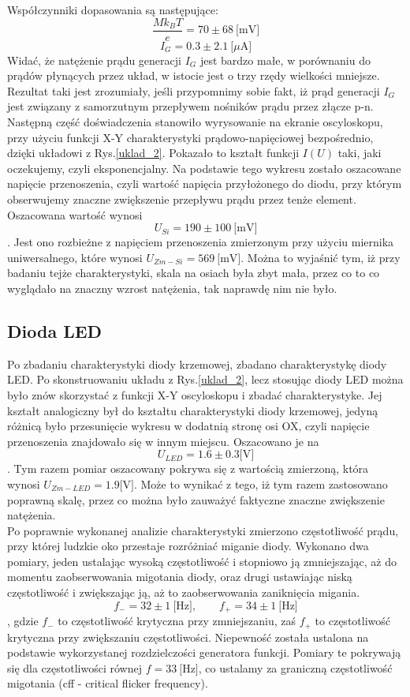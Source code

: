 \documentclass[10pt,a4paper]{article}
\begin{document}
Współczynniki dopasowania są następujące:
$$ \frac{Mk_BT}{e} = 70 \pm 68 \ \text{[mV]}$$
$$ I_G = 0.3 \pm 2.1 \ \text{[$\mu$A]} $$
Widać, że natężenie prądu generacji $I_G$ jest bardzo małe, w porównaniu do prądów płynących przez układ, w istocie jest o trzy rzędy wielkości mniejsze. Rezultat taki jest zrozumiały, jeśli przypomnimy sobie fakt, iż prąd generacji $I_G$ jest związany z samorzutnym przepływem nośników prądu przez złącze p-n. \\
Następną część doświadczenia stanowiło wyrysowanie na ekranie oscyloskopu, przy użyciu funkcji X-Y charakterystyki prądowo-napięciowej bezpośrednio, dzięki układowi z Rys.\ref{uklad_2}. Pokazało to kształt funkcji $I(U)$ taki, jaki oczekujemy, czyli eksponencjalny. Na podstawie tego wykresu zostało oszacowane napięcie przenoszenia, czyli wartość napięcia przyłożonego do diodu, przy którym obserwujemy znaczne zwiększenie przepływu prądu przez tenże element. Oszacowana wartość wynosi 
$$ U_{Si} = 190 \pm 100 \ \text{[mV]} $$.
Jest ono rozbieżne z napięciem przenoszenia zmierzonym przy użyciu miernika uniwersalnego, które wynosi $U_{Zm-Si} = 569 \ \text{[mV]}$. Można to wyjaśnić tym, iż przy badaniu tejże charakterystyki, skala na osiach była zbyt mała, przez co to co wyglądało na znaczny wzrost natężenia, tak naprawdę nim nie było.

\subsection*{Dioda LED}
Po zbadaniu charakterystyki diody krzemowej, zbadano charakterystykę diody LED. Po skonstruowaniu układu z Rys.\ref{uklad_2}, lecz stosując diody LED można było znów skorzystać z funkcji X-Y oscyloskopu i zbadać charakterystyke. Jej kształt analogiczny był do kształtu charakterystyki diody krzemowej, jedyną różnicą było przesunięcie wykresu w dodatnią stronę osi OX, czyli napięcie przenoszenia znajdowało się w innym miejscu. Oszacowano je na 
$$ U_{LED} = 1.6 \pm 0.3 \text{[V]} $$. 
Tym razem pomiar oszacowany pokrywa się z wartością zmierzoną, która wynosi $U_{Zm-LED} = 1.9 \text{[V]}$. Może to wynikać z tego, iż tym razem zastosowano poprawną skalę, przez co można było zauważyć faktyczne znaczne zwiększenie natężenia. \\
Po poprawnie wykonanej analizie charakterystyki zmierzono częstotliwość prądu, przy której ludzkie oko przestaje rozróżniać miganie diody. Wykonano dwa pomiary, jeden ustalając wysoką częstotliwość i stopniowo ją zmniejszając, aż do momentu zaobserwowania migotania diody, oraz drugi ustawiając niską częstotliwość i zwiększając ją, aż to zaobserwowania zaniknięcia migania.
$$ f_{-} = 32 \pm 1 \ \text{[Hz]}, \qquad f_{+} = 34 \pm 1 \ \text{[Hz]} $$, gdzie $f_-$ to częstotliwość krytyczna przy zmniejszaniu, zaś $f_+$ to częstotliwość krytyczna przy zwiększaniu częstotliwości.
Niepewność została ustalona na podstawie wykorzystanej rozdzielczości generatora funkcji.
Pomiary te pokrywają się dla częstotliwości równej $f = 33 \ \text{[Hz]}$, co ustalamy za graniczną częstotliwość migotania (cff - critical flicker frequency).
\end{document}

